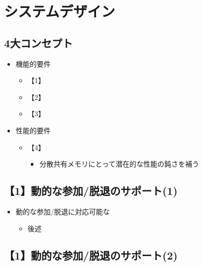 \documentclass[25pt,landscape,papersize]{jsarticle}
\begin{document}
\section{システムデザイン}

\subsection{4大コンセプト}

\begin{itemize}
\item 機能的要件
  \begin{itemize}
  \item 【1】
  \item 【2】
  \item 【3】
  \end{itemize}
\item 性能的要件
  \begin{itemize}
  \item 【4】
    \begin{itemize}
    \item 分散共有メモリにとって潜在的な性能の鈍さを補う
    \end{itemize}
  \end{itemize}
\end{itemize}

\subsection{【1】動的な参加/脱退のサポート(1)}

\begin{itemize}
\item 動的な参加/脱退に対応可能な
  \begin{itemize}
  \item 後述
  \end{itemize}
\end{itemize}


\subsection{【1】動的な参加/脱退のサポート(2)}
\end{document}

